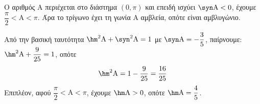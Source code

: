 \begin{alist}
\item Ο αριθμός A περιέχεται στο διάστημα $(0, \pi)$ και επειδή ισχύει $\syn \text{A} < 0$, έχουμε $\dfrac{\pi}{2} < \text{A} < \pi$.
Άρα το τρίγωνο έχει τη γωνία A αμβλεία, οπότε είναι αμβλυγώνιο.
\item Από την βασική ταυτότητα $\hm ^2\text{A} + \syn ^2\text{A} = 1$ με $\syn \text{A} = -\dfrac{3}{5}$, παίρνουμε: $\hm ^2\text{A} + \dfrac{9}{25} = 1$, οπότε
\[\hm ^2\text{A} = 1 - \dfrac{9}{25} = \dfrac{16}{25}\]
Επιπλέον, αφού $\dfrac{\pi}{2} < \text{A} < \pi$, έχουμε $\hm \text{A} > 0$, οπότε $\hm \text{A} = \dfrac{4}{5}$.
\end{alist}

